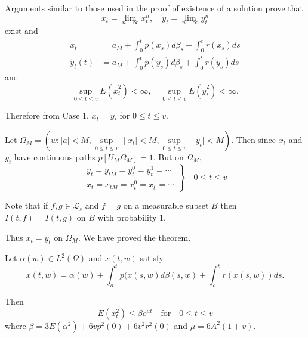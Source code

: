 Arguments similar to those used in the proof of existence of a
solution prove that 
$$
\tilde{x}_t = \lim\limits_{n-\infty} x^n_t,\quad \tilde{y}_t =
\lim\limits_{n-\infty} y^n_t 
$$
exist and  
\begin{align*}
\tilde{x}_t &= a_M +\int^t_0 p(\tilde{x}_s)d \beta_s + \int ^t_0
  r(\tilde{x}_s) ds\\ 
  \widetilde{y}_t(t) & = a_M + \int^t_0 p (\tilde{y}_s)d 
\beta_s + \int^t_0 r (\tilde{y}_s)ds
\end{align*} 
and 
$$
\sup\limits_{0 \leq t \leq v} E(\tilde{x}^2_t) < \infty,\quad
\sup\limits_{0 \leq t \leq v} E(\tilde{y}^2_t) < \infty. 
$$

Therefore from Case 1, $\tilde{x}_t = \tilde{y}_t$ for $0 \leq t
\leq v$. 

Let $\Omega_M = (w : |a | < M, \sup\limits_{0 \leq t \leq v}
\mid x_t \mid < M, \sup\limits_{0 \leq t \leq v} \mid y_t \mid <
M)$. Then since $x_t$ and $y_t$ have continuous paths $p[U_M \Omega_M]
= 1$. But on $\Omega_M$, 
\begin{equation*}
  \left.
  \begin{aligned}
    y_t = y_{tM} = y^0_t = y^1_t = \cdots \\
    x_t = x_{tM} = x^0_t = x^1_t = \cdots
  \end{aligned}
  \right\}
  \quad 0 \leq t \leq v
\end{equation*}\pageoriginale

Note that if $f, g \in \mathcal{L}_s$ and $f = g$ on a measurable
subset $B$ then  
$I (t, f ) =  I (t, g)$ on $B$ with probability 1.

Thus $x_t = y_t$ on $\Omega_M$. We have proved the theorem.
\begin{coro*}
Let $\alpha (w) \in L^2 (\Omega)$ and $x(t, w)$ satisfy
$$
x(t,w) = \alpha (w) + \int^t_o p (x(s, w)d \beta (s, w) + \int^t_o
r(x(s, w))ds. 
$$
\end{coro*}

Then
$$
E (x^2_t) \leq \beta e^{\mu t}\quad \text{for}\quad 0 \leq t \leq v
$$
where $\beta = 3E(\alpha^2) + 6v p^2 (0) + 6v^2 r^2 (0)$ and $\mu = 6A^2 (1+v)$.

